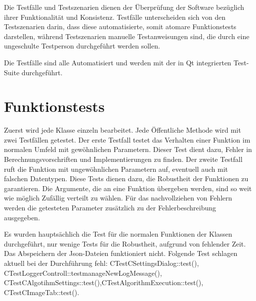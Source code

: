 Die Testfälle und Testszenarien dienen der Überprüfung der Software bezüglich ihrer Funktionalität und Konsistenz. Testfälle unterscheiden sich von den Testszenarien darin, dass diese automatisierte, somit atomare Funktionstests darstellen, während Testszenarien manuelle Testanweisungen sind, die durch eine ungeschulte Testperson durchgeführt werden sollen.

Die Testfälle sind alle Automatisiert und werden mit der in Qt integrierten Test-Suite durchgeführt.
\section{Funktionstests}
Zuerst wird jede Klasse einzeln bearbeitet. Jede Öffentliche Methode wird mit zwei Testfällen getestet. Der erste Testfall testet das Verhalten einer Funktion im normalen Umfeld mit gewöhnlichen Parametern. Dieser Test dient dazu, Fehler in Berechnungsvorschriften und Implementierungen zu finden. Der zweite Testfall ruft die Funktion mit ungewöhnlichen Parametern auf, eventuell auch mit falschen Datentypen. Diese Tests dienen dazu, die Robustheit der Funktionen zu garantieren. Die Argumente, die an eine Funktion übergeben werden, sind so weit wie möglich Zufällig verteilt zu wählen. Für das nachvollziehen von Fehlern werden die getesteten Parameter zusätzlich zu der Fehlerbeschreibung ausgegeben.

Es wurden hauptsächlich die Test für die normalen Funktionen der Klassen durchgeführt, nur wenige Tests für die Robustheit, aufgrund von fehlender Zeit. Das Abspeichern der Json-Dateien funktioniert nicht.
Folgende Test schlagen aktuell bei der Durchführung fehl: CTestCSettingsDialog::test(), CTestLoggerControll::testmanageNewLogMessage(), CTestCAlgotihmSettings::test(),CTestAlgorithmExecution::test(), CTestCImageTab::test().


